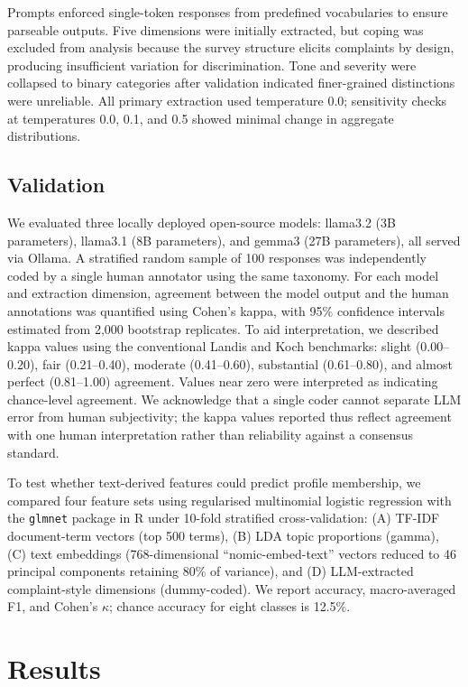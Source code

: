 \documentclass[sigconf]{acmart}
\begin{document}
Prompts enforced single-token responses from predefined vocabularies to ensure parseable outputs. Five dimensions were initially extracted, but coping was excluded from analysis because the survey structure elicits complaints by design, producing insufficient variation for discrimination. Tone and severity were collapsed to binary categories after validation indicated finer-grained distinctions were unreliable. All primary extraction used temperature 0.0; sensitivity checks at temperatures 0.0, 0.1, and 0.5 showed minimal change in aggregate distributions.

\subsection{Validation}
We evaluated three locally deployed open-source models: llama3.2 (3B parameters), llama3.1 (8B parameters), and gemma3 (27B parameters), all served via Ollama. A stratified random sample of 100 responses was independently coded by a single human annotator using the same taxonomy. For each model and extraction dimension, agreement between the model output and the human annotations was quantified using Cohen’s kappa, with 95\% confidence intervals estimated from 2,000 bootstrap replicates. To aid interpretation, we described kappa values using the conventional Landis and Koch benchmarks: slight (0.00--0.20), fair (0.21--0.40), moderate (0.41--0.60), substantial (0.61--0.80), and almost perfect (0.81--1.00) agreement. Values near zero were interpreted as indicating chance-level agreement. We acknowledge that a single coder cannot separate LLM error from human subjectivity; the kappa values reported thus reflect agreement with one human interpretation rather than reliability against a consensus standard.

To test whether text-derived features could predict profile membership, we compared four feature sets using regularised multinomial logistic regression with the \texttt{glmnet} package in R under 10-fold stratified cross-validation: (A) TF-IDF document-term vectors (top 500 terms), (B) LDA topic proportions (gamma), (C) text embeddings (768-dimensional ``nomic-embed-text'' vectors reduced to 46 principal components retaining 80\% of variance), and (D) LLM-extracted complaint-style dimensions (dummy-coded). We report accuracy, macro-averaged F1, and Cohen's $\kappa$; chance accuracy for eight classes is 12.5\%.

\section{Results}
\end{document}
